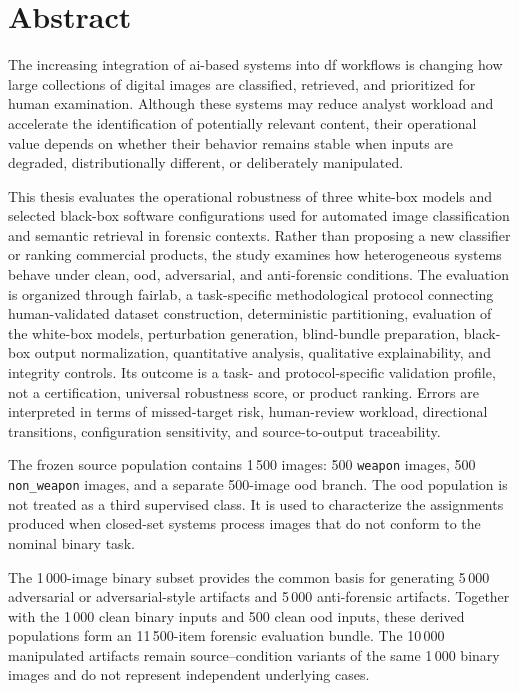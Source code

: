 
\chapter*{Abstract}
\label{chap:abstract}
\thispagestyle{empty}

The increasing integration of \gls{ai}-based systems into \gls{df} workflows
is changing how large collections of digital images are classified, retrieved,
and prioritized for human examination. Although these systems may reduce
analyst workload and accelerate the identification of potentially relevant
content, their operational value depends on whether their behavior remains
stable when inputs are degraded, distributionally different, or deliberately
manipulated.

This thesis evaluates the operational robustness of three white-box models
and selected black-box software configurations used for automated image
classification and semantic retrieval in forensic contexts. Rather than
proposing a new classifier or ranking commercial products, the study examines
how heterogeneous systems behave under clean, \gls{ood}, adversarial, and
anti-forensic conditions. The evaluation is organized through \gls{fairlab}, a
task-specific methodological protocol connecting human-validated dataset
construction, deterministic partitioning, evaluation of the white-box models,
perturbation generation, blind-bundle preparation, black-box output
normalization, quantitative analysis, qualitative explainability, and integrity
controls. Its outcome is a task- and protocol-specific validation profile,
not a certification, universal robustness score, or product ranking.
Errors are interpreted in terms of missed-target risk, human-review
workload, directional transitions, configuration sensitivity, and
source-to-output traceability.

The frozen source population contains 1\,500 images: 500
\texttt{weapon} images, 500 \texttt{non\_weapon} images, and a separate
500-image \gls{ood} branch. The \gls{ood} population is not treated as a third
supervised class. It is used to characterize the assignments produced when
closed-set systems process images that do not conform to the nominal binary
task.

The 1\,000-image binary subset provides the common basis for generating 5\,000
adversarial or adversarial-style artifacts and 5\,000 anti-forensic artifacts.
Together with the 1\,000 clean binary inputs and 500 clean \gls{ood} inputs,
these derived populations form an 11\,500-item forensic evaluation bundle. The
10\,000 manipulated artifacts remain source--condition variants of the same
1\,000 binary images and do not represent independent underlying cases.


